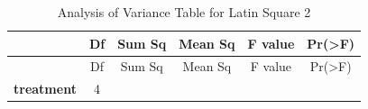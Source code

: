 \documentclass[]{article}
\begin{document}
\begin{longtable}[]{@{}cccccc@{}}
\caption{Analysis of Variance Table for Latin Square 2}\tabularnewline
\toprule
\begin{minipage}[b]{0.19\columnwidth}\centering\strut
~\strut
\end{minipage} & \begin{minipage}[b]{0.06\columnwidth}\centering\strut
Df\strut
\end{minipage} & \begin{minipage}[b]{0.10\columnwidth}\centering\strut
Sum Sq\strut
\end{minipage} & \begin{minipage}[b]{0.12\columnwidth}\centering\strut
Mean Sq\strut
\end{minipage} & \begin{minipage}[b]{0.12\columnwidth}\centering\strut
F value\strut
\end{minipage} & \begin{minipage}[b]{0.12\columnwidth}\centering\strut
Pr(\textgreater{}F)\strut
\end{minipage}\tabularnewline
\midrule
\endfirsthead
\toprule
\begin{minipage}[b]{0.19\columnwidth}\centering\strut
~\strut
\end{minipage} & \begin{minipage}[b]{0.06\columnwidth}\centering\strut
Df\strut
\end{minipage} & \begin{minipage}[b]{0.10\columnwidth}\centering\strut
Sum Sq\strut
\end{minipage} & \begin{minipage}[b]{0.12\columnwidth}\centering\strut
Mean Sq\strut
\end{minipage} & \begin{minipage}[b]{0.12\columnwidth}\centering\strut
F value\strut
\end{minipage} & \begin{minipage}[b]{0.12\columnwidth}\centering\strut
Pr(\textgreater{}F)\strut
\end{minipage}\tabularnewline
\midrule
\endhead
\begin{minipage}[t]{0.19\columnwidth}\centering\strut
\textbf{treatment}\strut
\end{minipage} & \begin{minipage}[t]{0.06\columnwidth}\centering\strut
4\strut
\end{minipage} & \begin{minipage}[t]{0.10\columnwidth}\centering\strut

\end{minipage}
\end{longtable}
\end{document}
